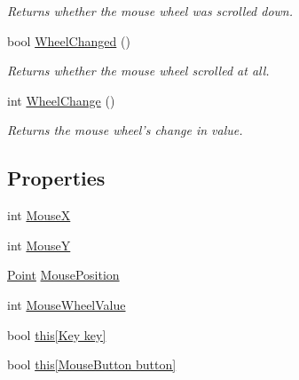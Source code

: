 \begin{DoxyCompactItemize}
\begin{DoxyCompactList}\small\item\em Returns whether the mouse wheel was scrolled down. \end{DoxyCompactList}\item 
bool \hyperlink{class_tri_devs_1_1_tri_engine2_d_1_1_input_1_1_input_manager_aa54a46c1abdbacb44b03737def38d70f}{Wheel\-Changed} ()
\begin{DoxyCompactList}\small\item\em Returns whether the mouse wheel scrolled at all. \end{DoxyCompactList}\item 
int \hyperlink{class_tri_devs_1_1_tri_engine2_d_1_1_input_1_1_input_manager_af8aa353e5d9434776181a42312c1499b}{Wheel\-Change} ()
\begin{DoxyCompactList}\small\item\em Returns the mouse wheel's change in value. \end{DoxyCompactList}\end{DoxyCompactItemize}
\subsection*{Properties}
\begin{DoxyCompactItemize}
\item 
int \hyperlink{class_tri_devs_1_1_tri_engine2_d_1_1_input_1_1_input_manager_afc5226998ffe43a5ee2cdd74de44d1c0}{Mouse\-X}
\item 
int \hyperlink{class_tri_devs_1_1_tri_engine2_d_1_1_input_1_1_input_manager_a532a033f6ff070bc71d9fbdccda12110}{Mouse\-Y}
\item 
\hyperlink{struct_tri_devs_1_1_tri_engine2_d_1_1_point}{Point} \hyperlink{class_tri_devs_1_1_tri_engine2_d_1_1_input_1_1_input_manager_aaa0b509eeb71575e3787951bdcd5a963}{Mouse\-Position}
\item 
int \hyperlink{class_tri_devs_1_1_tri_engine2_d_1_1_input_1_1_input_manager_a398bf5b07143fadc5eb3e5b273f14a23}{Mouse\-Wheel\-Value}
\item 
bool \hyperlink{class_tri_devs_1_1_tri_engine2_d_1_1_input_1_1_input_manager_a55645bfeff59626e79d2cfa4eee856be}{this\mbox{[}\-Key key\mbox{]}}
\item 
bool \hyperlink{class_tri_devs_1_1_tri_engine2_d_1_1_input_1_1_input_manager_abe6100586cfcbfecf8197274dddf6d91}{this\mbox{[}\-Mouse\-Button button\mbox{]}}
\end{DoxyCompactItemize}


